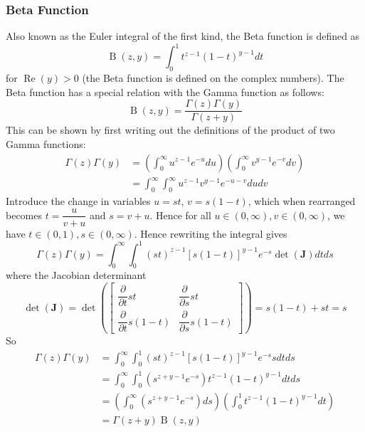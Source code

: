 \documentclass[11pt]{report} %
\begin{document}
\subsubsection{Beta Function}

Also known as the Euler integral of the first kind, the Beta function is defined as
\begin{equation}
\operatorname{B}\left(z, y\right) = \int_{0}^{1}t^{z - 1}\left(1 - t\right)^{y - 1}dt
\end{equation}
for $\operatorname{Re}\left(y\right) > 0$ (the Beta function is defined on the complex numbers). The Beta function has a special relation with the Gamma function as follows:
\begin{equation}
\operatorname{B}\left(z, y\right) = \dfrac{\Gamma\left(z\right)\Gamma\left(y\right)}{\Gamma\left(z + y\right)}
\end{equation}
This can be shown by first writing out the definitions of the product of two Gamma functions:
\begin{align}
\Gamma\left(z\right)\Gamma\left(y\right) &= \left(\int_{0}^{\infty}u^{z - 1}e^{-u}du\right)\left(\int_{0}^{\infty}v^{y - 1}e^{-v}dv\right) \\
&= \int_{0}^{\infty}\int_{0}^{\infty}u^{z - 1}v^{y - 1}e^{-u - v}dudv
\end{align}
Introduce the change in variables $u = st$, $v = s\left(1 - t\right)$, which when rearranged becomes $t = \dfrac{u}{v + u}$ and $s = v + u$. Hence for all $u \in \left(0, \infty\right), v \in \left(0, \infty\right)$, we have $t \in\left(0, 1\right), s \in\left(0, \infty\right)$. Hence rewriting the integral gives
\begin{equation}
\Gamma\left(z\right)\Gamma\left(y\right)  = \int_{0}^{\infty}\int_{0}^{1}\left(st\right)^{z - 1}\left[s\left(1 - t\right)\right]^{y - 1}e^{-s}\det\left(\mathbf{J}\right)dtds
\end{equation}
where the Jacobian determinant
\begin{equation}
\det\left(\mathbf{J}\right) = \det\left(\begin{bmatrix}\dfrac{\partial}{\partial t}st & \dfrac{\partial}{\partial s}st\\
\dfrac{\partial}{\partial t}s\left(1-t\right) & \dfrac{\partial}{\partial s}s\left(1-t\right)
\end{bmatrix}\right) = s\left(1 - t\right) + st = s
\end{equation}
So
\begin{align}
\Gamma\left(z\right)\Gamma\left(y\right) &= \int_{0}^{\infty}\int_{0}^{1}\left(st\right)^{z - 1}\left[s\left(1 - t\right)\right]^{y - 1}e^{-s}sdtds \\
&= \int_{0}^{\infty}\int_{0}^{1}\left(s^{z + y - 1}e^{-s}\right)t^{z - 1}\left(1 - t\right)^{y - 1}dtds \\
&= \left(\int_{0}^{\infty}\left(s^{z + y - 1}e^{-s}\right)ds\right)\left(\int_{0}^{1}t^{z - 1}\left(1 - t\right)^{y - 1}dt\right) \\
&= \Gamma\left(z + y\right)\operatorname{B}\left(z, y\right)
\end{align}
\end{document}
